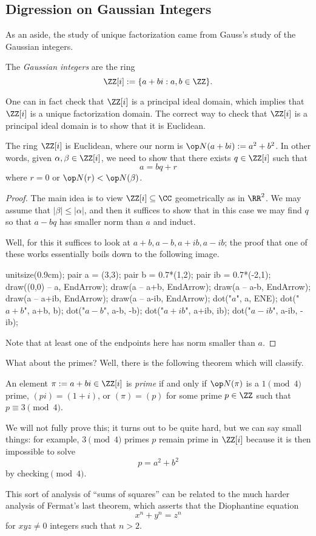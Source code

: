 \subsection{Digression on Gaussian Integers}
As an aside, the study of unique factorization came from Gauss's study of the Gaussian integers.
\begin{definition}
	The \textit{Gaussian integers} are the ring
	\[\ZZ[i]:=\{a+bi:a,b\in\ZZ\}.\]
\end{definition}
One can in fact check that $\ZZ[i]$ is a principal ideal domain, which implies that $\ZZ[i]$ is a unique factorization domain. The correct way to check that $\ZZ[i]$ is a principal ideal domain is to show that it is Euclidean.
\begin{lemma}
	The ring $\ZZ[i]$ is Euclidean, where our norm is $\op N(a+bi):=a^2+b^2$. In other words, given $\alpha,\beta\in\ZZ[i]$, we need to show that there exists $q\in\ZZ[i]$ such that
	\[a=bq+r\]
	where $r=0$ or $\op N(r)<\op N(\beta)$.
\end{lemma}
\begin{proof}
	The main idea is to view $\ZZ[i]\subseteq\CC$ geometrically as in $\RR^2$. We may assume that $|\beta|\le|\alpha|$, and then it suffices to show that in this case we may find $q$ so that $a-bq$ has smaller norm than $a$ and induct.
	
	Well, for this it suffices to look at $a+b,a-b,a+ib,a-ib$; the proof that one of these works essentially boils down to the following image.
	\begin{center}
		\begin{asy}
			unitsize(0.9cm);
			pair a = (3,3);
			pair b = 0.7*(1,2);
			pair ib = 0.7*(-2,1);
			draw((0,0) -- a, EndArrow);
			draw(a -- a+b, EndArrow);
			draw(a -- a-b, EndArrow);
			draw(a -- a+ib, EndArrow);
			draw(a -- a-ib, EndArrow);
			dot("$a$", a, ENE);
			dot("$a+b$", a+b, b);
			dot("$a-b$", a-b, -b);
			dot("$a+ib$", a+ib, ib);
			dot("$a-ib$", a-ib, -ib);
		\end{asy}
	\end{center}
	Note that at least one of the endpoints here has norm smaller than $a$.
\end{proof}
What about the primes? Well, there is the following theorem which will classify.
\begin{theorem}
	An element $\pi:=a+bi\in\ZZ[i]$ is \textit{prime} if and only if $\op N(\pi)$ is a $1\pmod4$ prime, $(pi)=(1+i)$, or $(\pi)=(p)$ for some prime $p\in\ZZ$ such that $p\equiv3\pmod4$.
\end{theorem}
We will not fully prove this; it turns out to be quite hard, but we can say small things: for example, $3\pmod4$ primes $p$ remain prime in $\ZZ[i]$ because it is then impossible to solve
\[p=a^2+b^2\]
by checking$\pmod4$.
\begin{remark}
	This sort of analysis of ``sums of squares'' can be related to the much harder analysis of Fermat's last theorem, which asserts that the Diophantine equation
	\[x^n+y^n=z^n\]
	for $xyz\ne0$ integers such that $n>2$.
\end{remark}


